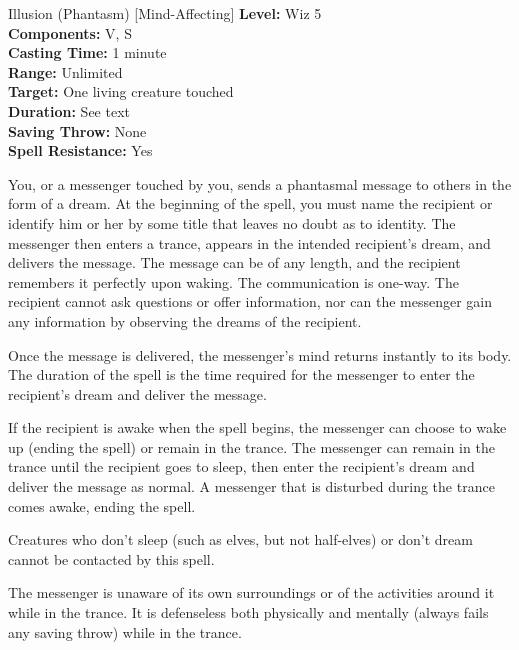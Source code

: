 {Illusion (Phantasm) [Mind-Affecting]}
{
	\textbf{Level:}
	Wiz 5\\
	\textbf{Components:}
	V, S\\
	\textbf{Casting Time:}
	1 minute\\
	\textbf{Range:}
	Unlimited\\
	\textbf{Target:}
	One living creature touched\\
	\textbf{Duration:}
	See text\\
	\textbf{Saving Throw:}
	None\\
	\textbf{Spell Resistance:}
	Yes\\
}
{
	You, or a messenger touched by you, sends a phantasmal message to others in the form of a dream. At the beginning of the spell, you must name the recipient or identify him or her by some title that leaves no doubt as to identity. The messenger then enters a trance, appears in the intended recipient's dream, and delivers the message. The message can be of any length, and the recipient remembers it perfectly upon waking. The communication is one-way. The recipient cannot ask questions or offer information, nor can the messenger gain any information by observing the dreams of the recipient.

	Once the message is delivered, the messenger's mind returns instantly to its body. The duration of the spell is the time required for the messenger to enter the recipient's dream and deliver the message.

	If the recipient is awake when the spell begins, the messenger can choose to wake up (ending the spell) or remain in the trance. The messenger can remain in the trance until the recipient goes to sleep, then enter the recipient's dream and deliver the message as normal. A messenger that is disturbed during the trance comes awake, ending the spell.

	Creatures who don't sleep (such as elves, but not half-elves) or don't dream cannot be contacted by this spell.

	The messenger is unaware of its own surroundings or of the activities around it while in the trance. It is defenseless both physically and mentally (always fails any saving throw) while in the trance.

}
